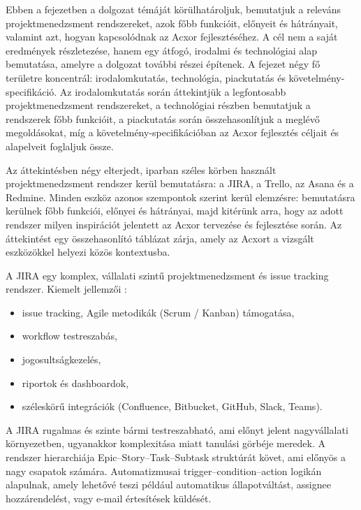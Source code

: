 


Ebben a fejezetben a dolgozat témáját körülhatároljuk, bemutatjuk a releváns projektmenedzsment rendszereket, azok főbb funkcióit, előnyeit és hátrányait, valamint azt, hogyan kapcsolódnak az Acxor fejlesztéséhez. A cél nem a saját eredmények részletezése, hanem egy átfogó, irodalmi és technológiai alap bemutatása, amelyre a dolgozat további részei építenek. A fejezet négy fő területre koncentrál: irodalomkutatás, technológia, piackutatás és követelmény-specifikáció. Az irodalomkutatás során áttekintjük a legfontosabb projektmenedzsment rendszereket, a technológiai részben bemutatjuk a rendszerek főbb funkcióit, a piackutatás során összehasonlítjuk a meglévő megoldásokat, míg a követelmény-specifikációban az Acxor fejlesztés céljait és alapelveit foglaljuk össze.


Az áttekintésben négy elterjedt, iparban széles körben használt projektmenedzsment rendszer kerül bemutatásra: a JIRA, a Trello, az Asana és a Redmine. Minden eszköz azonos szempontok szerint kerül elemzésre: bemutatásra kerülnek főbb funkciói, előnyei és hátrányai, majd kitérünk arra, hogy az adott rendszer milyen inspirációt jelentett az Acxor tervezése és fejlesztése során. Az áttekintést egy összehasonlító táblázat zárja, amely az Acxort a vizsgált eszközökkel helyezi közös kontextusba.


A JIRA egy komplex, vállalati szintű projektmenedzsment és issue tracking rendszer. Kiemelt jellemzői \cite{jira}:

\begin{itemize}
\item issue tracking, Agile metodikák (Scrum / Kanban) támogatása,
\item workflow testreszabás,
\item jogosultságkezelés,
\item riportok és dashboardok,
\item széleskörű integrációk (Confluence, Bitbucket, GitHub, Slack, Teams).
\end{itemize}

A JIRA rugalmas és szinte bármi testreszabható, ami előnyt jelent nagyvállalati környezetben, ugyanakkor komplexitása miatt tanulási görbéje meredek. A rendszer hierarchiája Epic–Story–Task–Subtask struktúrát követ, ami előnyös a nagy csapatok számára. Automatizmusai trigger–condition–action logikán alapulnak, amely lehetővé teszi például automatikus állapotváltást, assignee hozzárendelést, vagy e-mail értesítések küldését.

